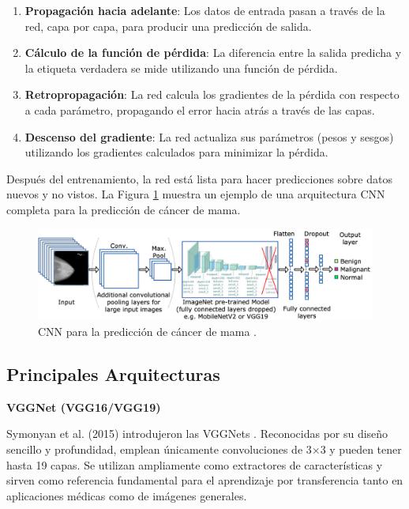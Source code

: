 \documentclass[a4paper,10pt]{book}
\begin{document}
\begin{enumerate}
\item \textbf{Propagación hacia adelante}: Los datos de entrada pasan a través de la red, capa por capa, para producir una predicción de salida.
\item \textbf{Cálculo de la función de pérdida}: La diferencia entre la salida predicha y la etiqueta verdadera se mide utilizando una función de pérdida.
\item \textbf{Retropropagación}: La red calcula los gradientes de la pérdida con respecto a cada parámetro, propagando el error hacia atrás a través de las capas.
\item \textbf{Descenso del gradiente}: La red actualiza sus parámetros (pesos y sesgos) utilizando los gradientes calculados para minimizar la pérdida.
\end{enumerate}

Después del entrenamiento, la red está lista para hacer predicciones sobre datos nuevos y no vistos. La Figura \ref{fig:cnn_breast} muestra un ejemplo de una arquitectura CNN completa para la predicción de cáncer de mama.

\begin{figure}[h!]
\centering
\includegraphics[width=0.9\linewidth]{reports//assets/cnn_breast.png}
\caption[Breast cancer CNN]{CNN para la predicción de cáncer de mama \cite{jaamour_divide_2023}.}
\label{fig:cnn_breast}
\end{figure}

\subsection{Principales Arquitecturas}

\textbf{VGGNet (VGG16/VGG19)}

Symonyan et al. (2015) introdujeron las VGGNets \cite{simonyanVeryDeepConvolutional}. Reconocidas por su diseño sencillo y profundidad, emplean únicamente convoluciones de 3×3 y pueden tener hasta 19 capas. Se utilizan ampliamente como extractores de características y sirven como referencia fundamental para el aprendizaje por transferencia tanto en aplicaciones médicas como de imágenes generales.
\end{document}
